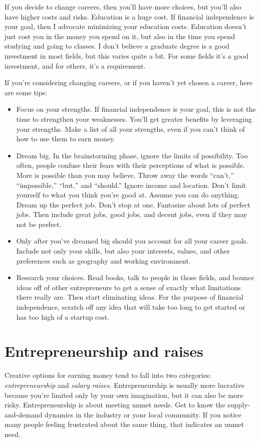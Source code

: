 If you decide to change careers, then you'll have more choices, but you'll also have higher costs and risks. Education is a huge cost. If financial independence is your goal, then I advocate minimizing your education costs. Education doesn't just cost you in the money you spend on it, but also in the time you spend studying and going to classes. I don't believe a graduate degree is a good investment in most fields, but this varies quite a bit. For some fields it's a good investment, and for others, it's a requirement.

If you're considering changing careers, or if you haven't yet chosen a career, here are some tips:
\begin{itemize}
\item Focus on your strengths. If financial independence is your goal, this is not the time to strengthen your weaknesses. You'll get greater benefits by leveraging your strengths. Make a list of all your strengths, even if you can't think of how to use them to earn money.
\item Dream big. In the brainstorming phase, ignore the limits of possibility. Too often, people confuse their fears with their perceptions of what is possible. More is possible than you may believe. Throw away the words ``can't,'' ``impossible,'' ``but,'' and ``should.'' Ignore income and location. Don't limit yourself to what you think you're good at. Assume you can do anything. Dream up the perfect job. Don't stop at one. Fantasize about lots of perfect jobs. Then include great jobs, good jobs, and decent jobs, even if they may not be perfect.
\item Only after you've dreamed big should you account for all your career goals. Include not only your skills, but also your interests, values, and other preferences such as geography and working environment.
\item Research your choices. Read books, talk to people in those fields, and bounce ideas off of other entrepreneurs to get a sense of exactly what limitations there really are. Then start eliminating ideas. For the purpose of financial independence, scratch off any idea that will take too long to get started or has too high of a startup cost.
\end{itemize}

\section{Entrepreneurship and raises}
Creative options for earning money tend to fall into two categories: \emph{entrepreneurship} and \emph{salary raises.} Entrepreneurship is usually more lucrative because you're limited only by your own imagination, but it can also be more risky. Entrepreneurship is about meeting unmet needs. Get to know the supply-and-demand dynamics in the industry or your local community. If you notice many people feeling frustrated about the same thing, that indicates an unmet need.

